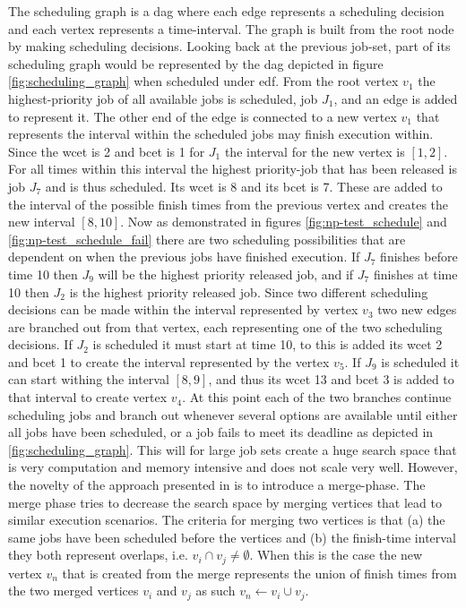 \documentclass{kththesis}
\begin{document}
The scheduling graph is a \acrshort{dag} where each edge represents a scheduling decision and each
vertex represents a time-interval. The graph is built from the root node by making scheduling
decisions. Looking back at the previous job-set, part of its scheduling graph would be represented
by the \acrshort{dag} depicted in figure \ref{fig:scheduling_graph} when scheduled under
\acrshort{edf}. From the root vertex $v_1$ the highest-priority job of all available jobs is
scheduled, job $J_1$, and an edge is added to represent it. The other end of the edge is connected
to a new vertex $v_1$ that represents the interval within the scheduled jobs may finish execution
within. Since the \acrshort{wcet} is 2 and \acrshort{bcet} is 1 for $J_1$ the interval for the new
vertex is $[1, 2]$.  For all times within this interval the highest priority-job that has been
released is job $J_7$ and is thus scheduled.  Its \acrshort{wcet} is 8 and its \acrshort{bcet} is 7.
These are added to the interval of the possible finish times from the previous vertex and creates
the new interval $[8,10]$. Now as demonstrated in figures \ref{fig:np-test_schedule} and
\ref{fig:np-test_schedule_fail} there are two scheduling possibilities that are dependent on when
the previous jobs have finished execution. If $J_7$ finishes before time 10 then $J_9$ will be the
highest priority released job, and if $J_7$ finishes at time 10 then $J_2$ is the highest priority
released job. Since two different scheduling decisions can be made within the interval represented
by vertex $v_3$ two new edges are branched out from that vertex, each representing one of the two
scheduling decisions. If $J_2$ is scheduled it must start at time 10, to this is added its
\acrshort{wcet} 2 and \acrshort{bcet} 1 to create the interval represented by the vertex $v_5$. If
$J_9$ is scheduled it can start withing the interval $[8, 9]$, and thus its \acrshort{wcet} 13 and
\acrshort{bcet} 3 is added to that interval to create vertex $v_4$. At this point each of the two
branches continue scheduling jobs and branch out whenever several options are available until either
all jobs have been scheduled, or a job fails to meet its deadline as depicted in
\ref{fig:scheduling_graph}. This will for large job sets create a huge search space that is very
computation and memory intensive and does not scale very well. However, the novelty of the approach
presented in \parencite{nasri_exact_2017} is to introduce a merge-phase. The merge phase tries to
decrease the search space by merging vertices that lead to similar execution scenarios. The
criteria for merging two vertices is that (a) the same jobs have been scheduled before the vertices
and (b) the finish-time interval they both represent overlaps, i.e. $v_i \cap v_j \neq \emptyset$.
When this is the case the new vertex $v_n$ that is created from the merge represents the union of
finish times from the two merged vertices $v_i$ and $v_j$ as such $v_n \gets v_i \cup v_j$.
\end{document}
